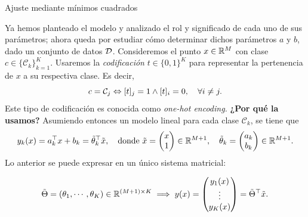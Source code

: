 \documentclass[9pt, handout]{beamer}
\begin{document}
\begin{frame}{Ajuste mediante mínimos cuadrados}

Ya hemos planteado el modelo y analizado el rol  y significado de cada uno de sus parámetros; ahora queda por estudiar cómo determinar dichos parámetros $a$ y $b$, dado un conjunto de datos ${\mathcal D}$.
\newline \pause 
Consideremos el  punto $x\in\mathbb{R}^M$ con clase $c\in\{\mathcal{C}_k\}_{k=1}^K$. Usaremos la \emph{codificación} $t \in\{0,1\}^K$ para representar la pertenencia de $x$ a su respectiva clase. Es decir, \pause
\begin{equation*}
  c = {\mathcal C}_j \Leftrightarrow [t]_j=1 \wedge [t]_i=0, \quad \forall i\neq j.
\end{equation*}
Este tipo de codificación  es conocida como \emph{one-hot  encoding.} \textbf{¿Por qué la usamos?} \pause \newline
Asumiendo entonces un modelo lineal para cada clase $\mathcal{C}_k$, se tiene que
\begin{equation*}
  y_k(x) = a_k^\top x + b_k = \tilde{\theta}_k^\top\tilde{x}, \quad \text{donde } \tilde{x} = \left( \begin{matrix} x\\ 1 \end{matrix}\right)\in\mathbb{R}^{M+1} ,\quad
  \tilde{\theta}_k = \left( \begin{matrix} a_k\\ b_k \end{matrix}\right)\in\mathbb{R}^{M+1}.
\end{equation*}
\newline \pause
Lo anterior se puede expresar en un único sistema matricial:

\begin{equation*}
\tilde{\Theta} = \left(\theta_1,\cdots,\theta_K\right)\in\mathbb{R}^{(M+1)\times K} \implies  y(x) = \left( \begin{matrix}y_1(x) \\\vdots \\ y_K(x) \end{matrix}\right) = \tilde{\Theta}^\top \tilde{x}.
  \end{equation*}




\end{frame}
\end{document}
